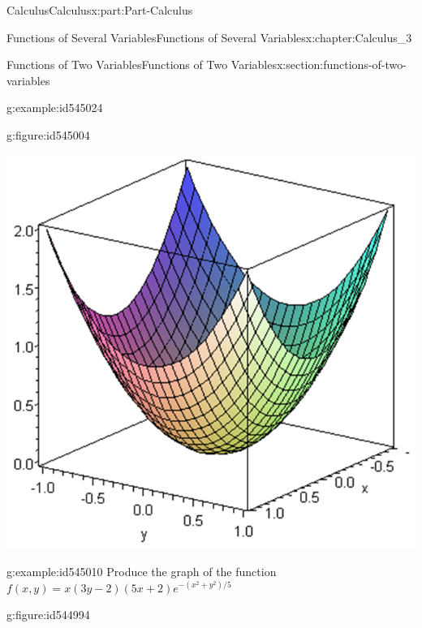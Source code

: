 \documentclass[oneside,10pt,]{book}
\numberwithin{equation}{section}
\begin{document}
\begin{partptx}{Calculus}{}{Calculus}{}{}{x:part:Part-Calculus}
\begin{chapterptx}{Functions of Several Variables}{}{Functions of Several Variables}{}{}{x:chapter:Calculus_3}
\begin{sectionptx}{Functions of Two Variables}{}{Functions of Two Variables}{}{}{x:section:functions-of-two-variables}
\begin{example}{}{g:example:id545024}
\begin{figureptx}{}{g:figure:id545004}{}
\begin{image}{0.125}{0.75}{0.125}%
\includegraphics[width=\linewidth]{./Calculus/Images/3/1_example4.png}
\end{image}%
\tcblower
\end{figureptx}%
%
\end{example}
\begin{example}{}{g:example:id545010}%
Produce the graph of the function \(f(x,y)=x(3y-2)(5x+2)e^{-(x^2+y^2)/5}\)%
\par\smallskip%
\noindent\hypertarget{g:solution:id545019}{}\begin{figureptx}{}{g:figure:id544994}{}%
\begin{image}{0.125}{0.75}{0.125}%

\end{image}
\end{figureptx}
\end{example}
\end{sectionptx}
\end{chapterptx}
\end{partptx}
\end{document}
